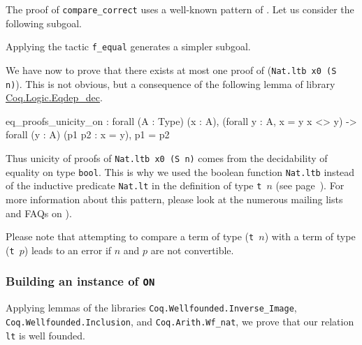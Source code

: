 \begin{remark}
 The proof of \texttt{compare\_correct} uses a well-known pattern of \coq{}.
Let us consider  the following subgoal.
 



Applying the tactic \texttt{f\_equal} generates a simpler subgoal.




We have now to prove that there exists at most one  proof of (\texttt{Nat.ltb x0 (S n)}). This is not obvious, but  a consequence of the following lemma of library 
\href{https://coq.inria.fr/distrib/current/stdlib/Coq.Logic.Eqdep_dec.html}{Coq.Logic.Eqdep\_dec}.

\label{sect:eq-proof-unicity}

\begin{Coqanswer}
eq_proofs_unicity_on :
forall (A : Type) (x : A),
(forall y : A, x = y \/ x <> y) -> 
forall (y : A) (p1 p2 : x = y), p1 = p2
\end{Coqanswer}

Thus unicity of proofs of \texttt{Nat.ltb x0 (S n)}  comes from the decidability of
equality on type \texttt{bool}.
This is why we used the boolean function \texttt{Nat.ltb} instead of the inductive predicate \texttt{Nat.lt} in the definition of type \texttt{t $n$} (see page~\pageref{def: Finite-ord-type}).
For more information about this pattern, please look at the numerous mailing lists and 
FAQs on \coq{}).


\end{remark}

\begin{remark}
  
Please note  that attempting to compare a term  of type (\texttt{t $n$}) with a term of
type (\texttt{t $p$})  leads to an error if $n$ and $p$ are not convertible.





\end{remark}

\subsubsection{Building an instance of \texttt{ON}}

Applying lemmas of the libraries \texttt{Coq.Wellfounded.Inverse\_Image}, \linebreak
 \texttt{Coq.Wellfounded.Inclusion}, and \texttt{Coq.Arith.Wf\_nat}, we prove that our
relation \texttt{lt} is well founded.

